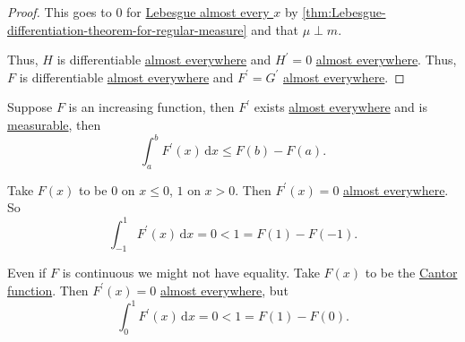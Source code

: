 \begin{proof}
	This goes to \(0\) for \hyperref[def:mu-almost-everywhere]{Lebesgue almost every \(x\)} by \autoref{thm:Lebesgue-differentiation-theorem-for-regular-measure}
	and that \(\mu \perp m\).

	Thus, \(H\) is differentiable \hyperref[def:mu-almost-everywhere]{almost everywhere} and \(H^\prime = 0\) \hyperref[def:mu-almost-everywhere]{almost everywhere}.
	Thus, \(F\) is differentiable \hyperref[def:mu-almost-everywhere]{almost everywhere} and \(F^\prime = G^\prime\) \hyperref[def:mu-almost-everywhere]{almost everywhere}.
\end{proof}

\begin{proposition}
	Suppose \(F\) is an increasing function, then \(F^\prime\) exists \hyperref[def:mu-almost-everywhere]{almost everywhere} and is
	\hyperref[def:measurable-function]{measurable}, then
	\[
		\int_a^b F^\prime (x) \,\mathrm{d}x \leq F(b) - F(a).
	\]
\end{proposition}

\begin{eg}
	Take \(F(x)\) to be \(0\) on \(x \leq 0\), \(1\) on \(x > 0\). Then \(F^\prime(x) = 0\) \hyperref[def:mu-almost-everywhere]{almost everywhere}. So
	\[
		\int_{-1}^1 F^\prime(x) \,\mathrm{d}x = 0 < 1 = F(1) - F(-1).
	\]

	Even if \(F\) is continuous we might not have equality. Take \(F(x)\) to be the \hyperref[sssec:Cantor-Function]{Cantor function}.
	Then \(F^\prime(x) = 0\) \hyperref[def:mu-almost-everywhere]{almost everywhere}, but
	\[
		\int_0^1 F^\prime(x) \,\mathrm{d}x = 0 < 1 = F(1) - F(0).
	\]
\end{eg}
